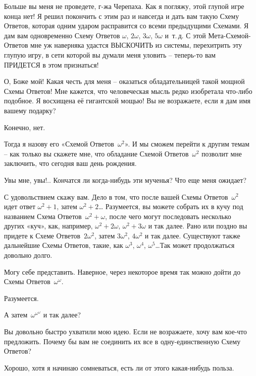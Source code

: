 \documentclass[../main.tex]{subfiles}
\begin{document}
\begin{dialogue}
 Больше вы меня не проведете, г-жа Черепаха. Как я погляжу, этой глупой игре конца нет! Я решил покончить с этим раз и навсегда и дать вам такую Схему Ответов, которая одним ударом расправится со всеми предыдущими Схемами. Я дам вам одновременно Схему Ответов $\omega$, $2\omega$, $3\omega$, $5\omega$ и~т.\,д. С этой Мета-Схемой-Ответов мне уж наверняка удастся ВЫСКОЧИТЬ из системы, перехитрить эту глупую игру, в сети которой вы думали меня уловить \--- теперь-то вам ПРИДЕТСЯ в этом признаться!

 О, Боже мой! Какая честь для меня \--- оказаться обладательницей такой мощной Схемы Ответов! Мне кажется, что человеческая мысль редко изобретала что-либо подобное. Я восхищена её гигантской мощью! Вы не возражаете, если я дам имя вашему подарку?

 Конечно, нет.

 Тогда я назову его «Схемой Ответов~$\omega^2$». И мы сможем перейти к другим темам \--- как только вы скажете мне, что обладание Схемой Ответов~$\omega^2$ позволит мне заключить, что сегодня ваш день рождения.

 Увы мне, увы!.. Кончатся ли когда-нибудь эти мученья? Что еще меня ожидает?

 С удовольствием скажу вам. Дело в том, что после вашей Схемы Ответов~$\omega^2$ идет ответ $\omega^2 + 1$, затем $\omega^2 + 2$\ldots{} Разумеется, вы можете собрать их в кучу под названием Схема Ответов~$\omega^2 + \omega$, после чего могут последовать несколько других «куч», как, например, $\omega^2 + 2\omega$, $\omega^2 + 3\omega$ и так далее. Рано или поздно вы придете к Схеме Ответов~$2\omega^2$, затем $3\omega^2$, $4\omega^2$ и так далее. Существуют также дальнейшие Схемы Ответов, такие, как $\omega^3$, $\omega^4$, $\omega^5$\ldots Так может продолжаться довольно долго.

 Могу себе представить. Наверное, через некоторое время так можно дойти до Схемы Ответов~$\omega^\omega$.

 Разумеется.

 А затем~$\omega^{\omega^\omega}$ и так далее?

 Вы довольно быстро ухватили мою идею. Если не возражаете, хочу вам кое-что предложить. Почему бы вам не соединить их все в одну-единственную Схему Ответов?

 Хорошо, хотя я начинаю сомневаться, есть ли от этого какая-нибудь польза.


\end{dialogue}
\end{document}

